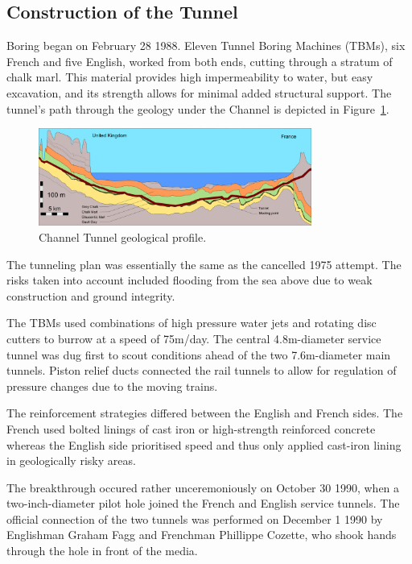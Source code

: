 \documentclass[12pt]{article} %
\begin{document}
\subsection{Construction of the Tunnel}
Boring began on February 28 1988. Eleven Tunnel Boring Machines (TBMs), six French and five English, worked from both ends, cutting through a stratum of chalk marl. This material provides high impermeability to water, but easy excavation, and its strength allows for minimal added structural support. The tunnel's path through the geology under the Channel is depicted in Figure~\ref{fig:geo}.

\begin{figure}[tp]
  \centering
  \includegraphics[width=0.8\textwidth]{geology}
  \caption{Channel Tunnel geological profile.}
  \label{fig:geo}
\end{figure}

The tunneling plan was essentially the same as the cancelled 1975 attempt. The risks taken into account included flooding from the sea above due to weak construction and ground integrity.

The TBMs used combinations of high pressure water jets and rotating disc cutters to burrow at a speed of 75m/day. The central 4.8m-diameter service tunnel was dug first to scout conditions ahead of the two 7.6m-diameter main tunnels. Piston relief ducts connected the rail tunnels to allow for regulation of pressure changes due to the moving trains.

The reinforcement strategies differed between the English and French sides. The French used bolted linings of cast iron or high-strength reinforced concrete whereas the English side prioritised speed and thus only applied cast-iron lining in geologically risky areas.

The breakthrough occured rather unceremoniously on October 30 1990, when a two-inch-diameter pilot hole joined the French and English service tunnels. The official connection of the two tunnels was performed on December 1 1990 by Englishman Graham Fagg and Frenchman Phillippe Cozette, who shook hands through the hole in front of the media.
\end{document}
